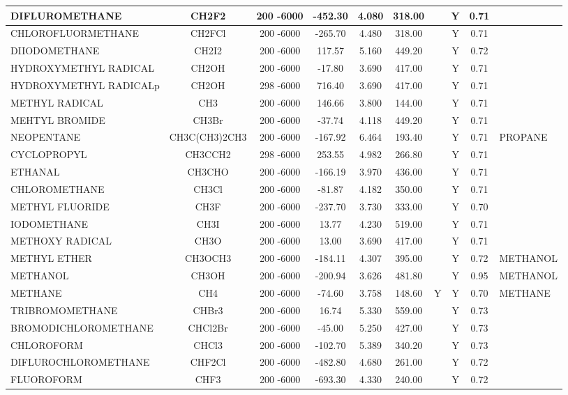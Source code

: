 \begin{longtable}{@{\extracolsep{\fill}}|l|c|c|c|c|c|c|c|c|l|}
DIFLUROMETHANE&CH2F2&200 -6000& -452.30& 4.080&   318.00& &Y& 0.71&\\ \hline
CHLOROFLUORMETHANE&CH2FCl&200 -6000& -265.70& 4.480&   318.00& &Y& 0.71&\\ \hline
DIIODOMETHANE&CH2I2&200 -6000&  117.57& 5.160&   449.20& &Y& 0.72&\\ \hline
HYDROXYMETHYL RADICAL&CH2OH&200 -6000&  -17.80& 3.690&   417.00& &Y& 0.71&\\ \hline
HYDROXYMETHYL RADICALp&CH2OH&298 -6000&  716.40& 3.690&   417.00& &Y& 0.71&\\ \hline
METHYL RADICAL&CH3&200 -6000&  146.66& 3.800&   144.00& &Y& 0.71&\\ \hline
MEHTYL BROMIDE&CH3Br&200 -6000&  -37.74& 4.118&   449.20& &Y& 0.71&\\ \hline
NEOPENTANE&CH3C(CH3)2CH3&200 -6000& -167.92& 6.464&   193.40& &Y& 0.71&PROPANE\\ \hline
CYCLOPROPYL&CH3CCH2&298 -6000&  253.55& 4.982&   266.80& &Y& 0.71&\\ \hline
ETHANAL&CH3CHO&200 -6000& -166.19& 3.970&   436.00& &Y& 0.71&\\ \hline
CHLOROMETHANE&CH3Cl&200 -6000&  -81.87& 4.182&   350.00& &Y& 0.71&\\ \hline
METHYL FLUORIDE&CH3F&200 -6000& -237.70& 3.730&   333.00& &Y& 0.70&\\ \hline
IODOMETHANE&CH3I&200 -6000&   13.77& 4.230&   519.00& &Y& 0.71&\\ \hline
METHOXY RADICAL&CH3O&200 -6000&   13.00& 3.690&   417.00& &Y& 0.71&\\ \hline
METHYL ETHER&CH3OCH3&200 -6000& -184.11& 4.307&   395.00& &Y& 0.72&METHANOL\\ \hline
METHANOL&CH3OH&200 -6000& -200.94& 3.626&   481.80& &Y& 0.95&METHANOL\\ \hline
METHANE&CH4&200 -6000&  -74.60& 3.758&   148.60&Y&Y& 0.70&METHANE\\ \hline
TRIBROMOMETHANE&CHBr3&200 -6000&   16.74& 5.330&   559.00& &Y& 0.73&\\ \hline
BROMODICHLOROMETHANE&CHCl2Br&200 -6000&  -45.00& 5.250&   427.00& &Y& 0.73&\\ \hline
CHLOROFORM&CHCl3&200 -6000& -102.70& 5.389&   340.20& &Y& 0.73&\\ \hline
DIFLUROCHLOROMETHANE&CHF2Cl&200 -6000& -482.80& 4.680&   261.00& &Y& 0.72&\\ \hline
FLUOROFORM&CHF3&200 -6000& -693.30& 4.330&   240.00& &Y& 0.72&\\ \hline

\end{longtable}
